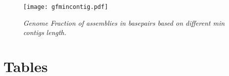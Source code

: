 \begin{figure} [h] 
\begin{center}  
\texttt{[image: gfmincontig.pdf]}  
\caption{\small \sl Genome Fraction of assemblies in basepairs based on different min contigs length.\label{fig:gf}}  
\end{center}  
\end{figure}  

\section*{Tables}
% 
%
%






